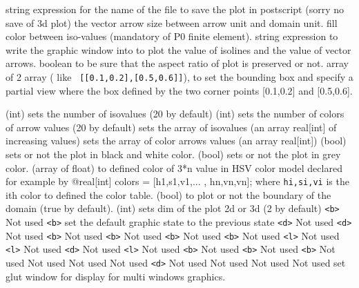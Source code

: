 \documentclass[a4paper,twoside,12pt]{book}
\begin{document}
\begin{description}
    \itemtt[ps=]    string expression for the name of the file to save the plot in postscript
    (sorry no save of 3d plot)
    \itemtt[coef=]   the vector arrow size between arrow unit and domain unit.
    \itemtt[fill=]   fill  color between iso-values (mandatory of P0 finite element).
     \itemtt[cmm=]  string expression to write the graphic window into
     \itemtt[value=]  to plot the value of isolines and the value of vector arrows.
    \itemtt[aspectratio=] boolean to be sure that the aspect ratio of plot
 is preserved or not.
    \itemtt[bb=] array of 2 array ( like \texttt{ [[0.1,0.2],[0.5,0.6]]}),
       to set the bounding box and specify a partial view where the  box defined by the two corner points [0.1,0.2] and [0.5,0.6].

    \itemtt[nbiso=]  (int) sets the number of isovalues (20 by default)
    \itemtt[nbarrow=]  (int) sets the number of colors of arrow values (20 by default)
    \itemtt[viso=]  sets the array  of  isovalues (an array real[int] of increasing values)
    \itemtt[varrow=]   sets the array of color arrows values (an array real[int])
    \itemtt[bw=]  (bool)  sets or not the plot in black and white color.
    \itemtt[grey=]  (bool)  sets or not the plot in grey color.
    \itemtt[hsv=]  (array of float) to defined color of 3*n value  in HSV color model declared  for example by
    \bFF
      @real[int] colors = [h1,s1,v1,... ,  hn,vn,vn];
    \eFF
     where \texttt{hi,si,vi} is the ith color to defined the color table.
    \itemtt[boundary=]  (bool) to plot or not the boundary of the domain (true by default).
    \itemtt[dim=]  (int)  sets dim of the plot 2d or 3d (2 by default)
	\itemtt[add=]  \texttt{<b>} Not used 
	\itemtt[prev=]   \texttt{<b>} set the default graphic state to the previous state
	\itemtt[ech=]   \texttt{<d>} Not used 
	\itemtt[ZScale=]   \texttt{<d>} Not used 
	\itemtt[WhiteBackground=]   \texttt{<b>} Not used 
	\itemtt[OpaqueBorders=]   \texttt{<b>} Not used 
	\itemtt[BorderAsMesh=]   \texttt{<b>} Not used 
	\itemtt[ShowMeshes=]   \texttt{<b>} Not used 
	\itemtt[ColorScheme=]   \texttt{<l>} Not used 
	\itemtt[ArrowShape=]   \texttt{<l>} Not used 
	\itemtt[ArrowSize=]   \texttt{<d>} Not used 
	\itemtt[ComplexDisplay=]   \texttt{<l>} Not used 
	\itemtt[LabelColors=]   \texttt{<b>} Not used 
	\itemtt[ShowAxes=]   \texttt{<b>} Not used 
	\itemtt[CutPlane=]   \texttt{<b>} Not used 
	\itemtt[CameraPosition=]    Not used 
	\itemtt[CameraFocalPoint=]   Not used 
	\itemtt[CameraViewUp=]   Not used 
	\itemtt[CameraViewAngle=]   \texttt{<d>} Not used 
	\itemtt[CameraClippingRange=]   Not used 
	\itemtt[CutPlaneOrigin=]   Not used 
	\itemtt[CutPlaneNormal=]   Not used 
	\itemtt[WindowIndex=]  set glut window for display for multi windows graphics.   
\end{description}
\end{document}
